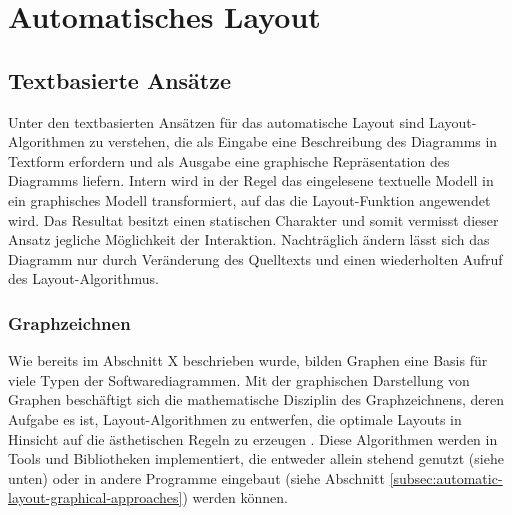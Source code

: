 
\section{Automatisches Layout}
\label{sec:automatic-layout}

 
\subsection{Textbasierte Ansätze}

Unter den textbasierten Ansätzen für das automatische Layout sind Layout-Algorithmen zu verstehen, die als Eingabe eine Beschreibung des Diagramms in Textform erfordern und als Ausgabe eine graphische Repräsentation des Diagramms liefern. Intern wird in der Regel das eingelesene textuelle Modell in ein graphisches Modell transformiert, auf das die Layout-Funktion angewendet wird. Das Resultat besitzt einen statischen Charakter und somit vermisst dieser Ansatz jegliche Möglichkeit der Interaktion. Nachträglich ändern lässt sich das Diagramm nur durch Veränderung des Quelltexts und einen wiederholten Aufruf des Layout-Algorithmus.

\subsubsection{Graphzeichnen}

Wie bereits im Abschnitt X beschrieben wurde, bilden Graphen eine Basis für viele Typen der Softwarediagrammen. Mit der graphischen Darstellung von Graphen beschäftigt sich die mathematische Disziplin des Graphzeichnens, deren Aufgabe es ist, Layout-Algorithmen zu entwerfen, die optimale Layouts in Hinsicht auf die ästhetischen Regeln zu erzeugen \cite{Maier12A-Pattern-based}. Diese Algorithmen werden in Tools und Bibliotheken implementiert, die entweder allein stehend genutzt (siehe unten) oder in andere Programme eingebaut (siehe Abschnitt \ref{subsec:automatic-layout-graphical-approaches}) werden können.

